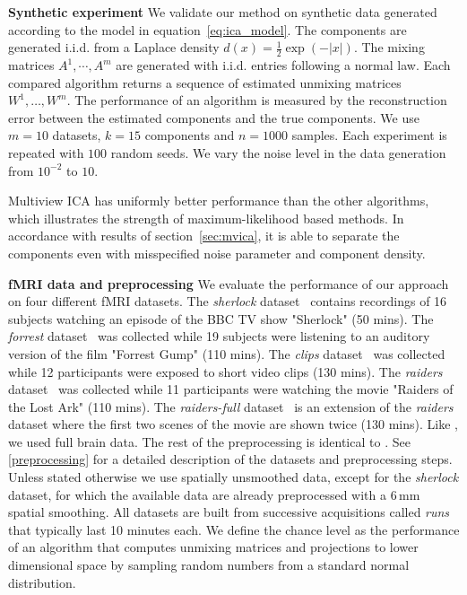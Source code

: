 \textbf{Synthetic experiment}
We validate our method on synthetic data generated according to the model in equation~\eqref{eq:ica_model}.
%
The components are generated i.i.d. from a Laplace density $d(x)=\frac12\exp(-|x|)$.
%
The mixing matrices $A^1,\cdots, A^m$ are generated with i.i.d. entries following a normal law.
Each compared algorithm returns a sequence of estimated unmixing matrices $W^1, \dots, W^m$.
%
The performance of an algorithm is measured by the reconstruction error between the estimated components and the true components.
%
%
We use $m=10$ datasets, $k=15$ components and $n=1000$ samples. Each experiment is repeated with $100$ random seeds.
%
We vary the noise level in the data generation from $10^{-2}$ to $10$.

Multiview ICA has uniformly better performance than the other algorithms, which illustrates the strength of maximum-likelihood based methods. In accordance with results of section~\ref{sec:mvica}, it is able to separate the components even with misspecified noise parameter and component density.
%

\textbf{fMRI data and preprocessing} 
We evaluate the performance of our approach on four different fMRI datasets.
%
The \emph{sherlock} dataset~\cite{chen2017shared} contains recordings of 16 subjects watching an episode of the BBC TV show "Sherlock" (50 mins).
%
The \emph{forrest} dataset~\cite{hanke2014high} was collected while 19 subjects were listening to an auditory version of the film "Forrest Gump" (110 mins).
%
The \emph{clips} dataset~\cite{ibc} was collected while 12 participants were exposed to short video clips (130 mins).
%
The \emph{raiders} dataset~\cite{ibc} was collected while 11 participants were watching the movie "Raiders of the Lost Ark" (110 mins).
%
The \emph{raiders-full} dataset~\cite{ibc} is an extension of the \emph{raiders} dataset where the first two scenes of the movie are shown twice (130 mins).
%
Like \cite{zhang2016searchlight}, we used full brain data. The rest of the preprocessing is identical to \cite{chen2017shared}. See \ref{preprocessing} for a detailed description of the datasets and preprocessing steps. Unless stated otherwise we use spatially unsmoothed data, except for the \emph{sherlock} dataset, for which the available data are already preprocessed with a 6\,mm spatial smoothing. All datasets are built from successive acquisitions called \emph{runs} that typically last 10 minutes each.
%
We define the chance level as the performance of an algorithm that computes unmixing matrices and projections to lower dimensional space by sampling random numbers from a standard normal distribution. 
%

